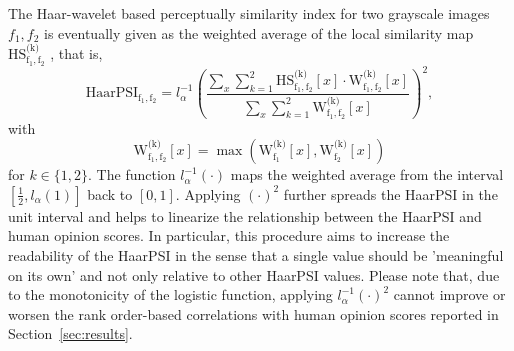 \documentclass[11pt,a4paper]{article}
\begin{document}
The Haar-wavelet based perceptually similarity index for two grayscale images $f_1,f_2$ is eventually given as the weighted average of the local similarity map $\operatorname{HS^\text{(k)}_{f_1,f_2}}$ , that is, 
\begin{equation}
\label{eq:haarpsi}
\operatorname{HaarPSI_{f_1,f_2}} = l_\alpha^{-1}\left(\frac{\sum\limits_x \sum\limits_{k=1}^2\operatorname{HS^\text{(k)}_{f_1,f_2}}[x]  \cdot \operatorname{W^\text{(k)}_{f_1,f_2}}[x]}{\sum\limits_x \sum\limits_{k=1}^2\operatorname{W^\text{(k)}_{f_1,f_2}}[x]}\right)^2, 
\end{equation}
with
\begin{equation}
\operatorname{W^\text{(k)}_{f_1,f_2}}[x] = \max(\operatorname{W^\text{(k)}_{f_1}}[x],\operatorname{W^\text{(k)}_{f_2}}[x])
\end{equation}
for $k\in \{1,2\}$.
The function $l_\alpha^{-1}(\cdot)$ maps the weighted average from the interval $[\frac{1}{2},l_\alpha(1)]$ back to $[0,1]$. Applying $(\cdot)^2$ further spreads the HaarPSI in the unit interval and helps to linearize the relationship between the HaarPSI and human opinion scores. In particular, this procedure aims to increase the readability of the HaarPSI in the sense that a single value should be 'meaningful on its own' and not only relative to other HaarPSI values. Please note that, due to the monotonicity of the logistic function, applying $l_\alpha^{-1}(\cdot)^2$ cannot improve or worsen the rank order-based correlations with human opinion scores reported in Section~\ref{sec:results}.

\
\end{document}
